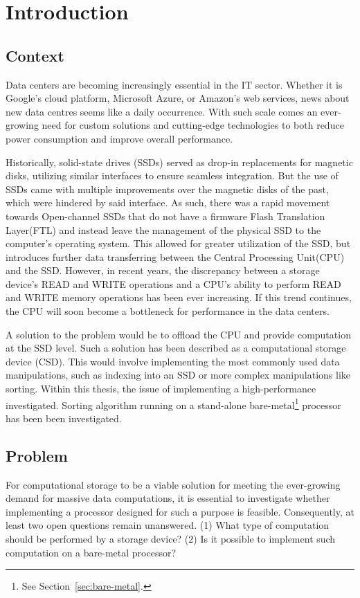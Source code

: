 \section{Introduction}
\subsection{Context}\label{sec:context}
Data centers are becoming increasingly essential in the IT sector. Whether it is
Google's cloud platform, Microsoft Azure, or Amazon's web services, news about
new data centres seems like a daily occurrence. With such scale comes an
ever-growing need for custom solutions and cutting-edge technologies to both
reduce power consumption and improve overall performance.

Historically, solid-state drives (SSDs) served as drop-in replacements for
magnetic disks, utilizing similar interfaces to ensure seamless integration. But
the use of SSDs came with multiple improvements over the magnetic disks of the
past, which were hindered by said interface. As such, there was a rapid movement
towards Open-channel SSDs that do not have a firmware Flash Translation
Layer(FTL) and instead leave the management of the physical SSD to the
computer's operating system. This allowed for greater utilization of the SSD,
but introduces further data transferring between the Central Processing
Unit(CPU) and the SSD. However, in recent years, the discrepancy between a
storage device's READ and WRITE operations and a CPU's ability to perform READ
and WRITE memory operations has been ever increasing. If this trend continues,
the CPU will soon become a bottleneck for performance in the data centers.

A solution to the problem would be to offload the CPU and provide computation at
the SSD level. Such a solution has been described as a computational storage
device (CSD). This would involve implementing the most commonly used data
manipulations, such as indexing into an SSD or more complex manipulations like
sorting. Within this thesis, the issue of implementing a high-performance
investigated. Sorting algorithm running on a stand-alone
bare-metal\footnote{\label{note:1}See Section~\ref{sec:bare-metal}.} processor
has been been investigated.


\subsection{Problem}\label{sec:problem}
For computational storage to be a viable solution for meeting the ever-growing
demand for massive data computations, it is essential to investigate whether
implementing a processor designed for such a purpose is feasible. Consequently,
at least two open questions remain unanswered. (1) What type of computation should be
performed by a storage device? (2) Is it possible to implement such computation
on a bare-metal processor?


